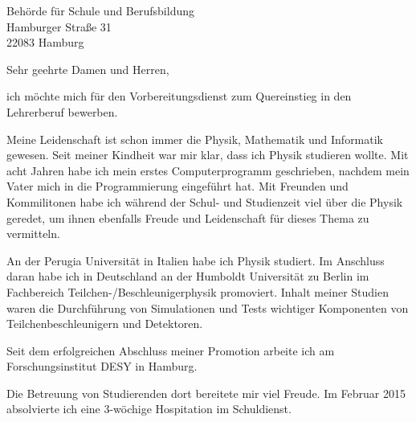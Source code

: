 \documentclass[ebner,paper=a4,fontsize=11pt,ngerman,BCOR=10mm]{scrlttr2}%
\begin{document}
\pagestyle{empty}

\begin{letter}{ Beh{\"o}rde f{\"u}r Schule und Berufsbildung\\
Hamburger Stra{\ss}e 31\\ 
22083 Hamburg}


\opening{Sehr geehrte Damen und Herren,} 

ich m{\"o}chte mich f{\"u}r den Vorbereitungsdienst zum Quereinstieg in den Lehrerberuf bewerben.

Meine Leidenschaft ist schon immer die Physik,  Mathematik und  Informatik gewesen.
Seit meiner Kindheit war mir klar, dass ich Physik studieren wollte. Mit acht Jahren habe ich mein erstes Computerprogramm
geschrieben, nachdem mein Vater mich in die Programmierung eingef{\"u}hrt hat.
Mit Freunden und Kommilitonen habe ich w{\"a}hrend der Schul- und Studienzeit viel {\"u}ber die Physik geredet, um ihnen ebenfalls Freude und Leidenschaft f{\"u}r dieses Thema zu vermitteln.


An der Perugia Universit{\"a}t in Italien habe ich Physik studiert. Im Anschluss daran habe ich in Deutschland an der Humboldt Universit{\"a}t zu Berlin im Fachbereich
Teilchen-/Beschleunigerphysik promoviert. Inhalt meiner Studien waren die Durchf{\"u}hrung von Simulationen und Tests wichtiger Komponenten von Teilchenbeschleunigern und Detektoren.

Seit dem erfolgreichen Abschluss meiner Promotion arbeite ich am Forschungsinstitut DESY in Hamburg. 


Die Betreuung von Studierenden dort bereitete mir viel Freude. Im Februar 2015 absolvierte ich eine 3-w{\"o}chige Hospitation im Schuldienst.


%


\end{letter}
\end{document}
